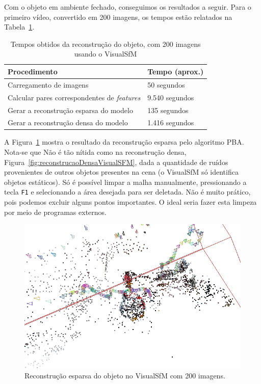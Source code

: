 Com o objeto em ambiente fechado, conseguimos os resultados a seguir. 
Para o primeiro vídeo, convertido em 200 imagens, os tempos estão relatados na
Tabela~\ref{tab:temposSfM}.
\begin{table}
\caption{Tempos obtidos da reconstrução do objeto, com 200 imagens usando o VisualSfM}
\label{tab:temposSfM}
\begin{tabular}{|l|p{4.7cm}|}
\hline
Procedimento & Tempo (aprox.) \\ \hline
Carregamento de imagens & 50 segundos \\ \hline
Calcular pares correspondentes de \emph{features} & 9.540 segundos \\ \hline
Gerar a reconstrução esparsa do modelo & 135 segundos \\ \hline
Gerar a reconstrução densa do modelo & 1.416 segundos \\ \hline
\end{tabular}
\end{table}

A Figura~\ref{fig:reconstrucaoEsparsaVisualSFM} mostra o resultado da
reconstrução esparsa pelo algoritmo PBA. Nota-se que Não é tão nítida como na reconstrução
densa, Figura~\ref{fig:reconstrucaoDensaVisualSFM}, dada a quantidade de ruídos
provenientes de outros objetos presentes na cena (o VisualSfM só identifica
objetos estáticos). Só é possível limpar a malha manualmente, pressionando a
tecla \texttt{F1} e selecionando a área desejada para ser deletada. Não é muito prático,
pois podemos excluir alguns pontos importantes. O ideal seria fazer esta limpeza
por meio de programas externos.

\begin{figure}[!h]
	\centering
	\includegraphics[width=0.5\linewidth]{figs/galinhasparsa.jpg}
	\caption{%
	Reconstrução esparsa do objeto no VisualSfM com 200 imagens.
	}\label{fig:reconstrucaoEsparsaVisualSFM}
\end{figure}

